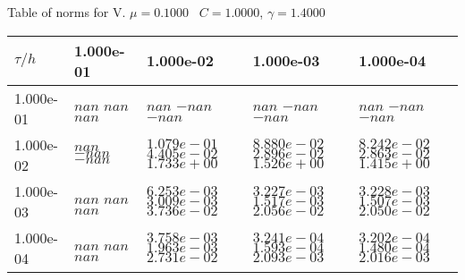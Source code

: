 \begin{center}
Table of norms for V. $\mu = 0.1000$ \, $C = 1.0000$, $\gamma = 1.4000$
  
\begin{tabular}{|p{1in}|p{1in}|p{1in}|p{1in}|p{1in}|} \hline
$\tau / h$ &1.000e-01 &1.000e-02 &1.000e-03 &1.000e-04 \\ \hline 
1.000e-01 & $nan$  $nan$  $nan$  & $nan$  $-nan$  $-nan$  & $nan$  $-nan$  $-nan$  & $nan$  $-nan$  $-nan$  \\ \hline 
1.000e-02 & $nan$  $-nan$  $-nan$  & $1.079e-01$  $4.405e-02$  $1.733e+00$  & $8.880e-02$  $2.896e-02$  $1.526e+00$  & $8.242e-02$  $2.863e-02$  $1.415e+00$  \\ \hline 
1.000e-03 & $nan$  $nan$  $nan$  & $6.253e-03$  $3.009e-03$  $3.736e-02$  & $3.227e-03$  $1.517e-03$  $2.056e-02$  & $3.228e-03$  $1.507e-03$  $2.050e-02$  \\ \hline 
1.000e-04 & $nan$  $nan$  $nan$  & $3.758e-03$  $1.963e-03$  $2.731e-02$  & $3.241e-04$  $1.593e-04$  $2.093e-03$  & $3.202e-04$  $1.480e-04$  $2.016e-03$  \\ \hline 

\end{tabular}\\[20pt]
\end{center}
